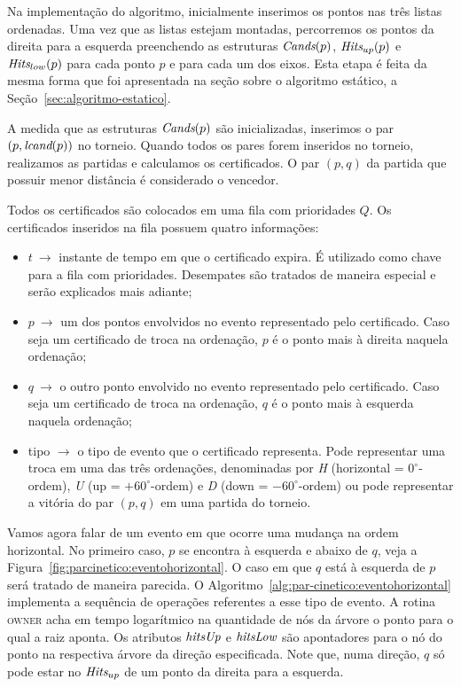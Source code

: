 Na implementação do algoritmo, inicialmente inserimos os pontos nas três listas ordenadas.
Uma vez que as listas estejam montadas, percorremos os pontos da direita para a esquerda
preenchendo as estruturas $\textit{Cands}(p)$, $\textit{Hits}_{up}(p)$ e $\textit{Hits}_{low}(p)$ para cada ponto $p$ e
para cada um dos eixos.
Esta etapa é feita da mesma forma que foi apresentada na seção sobre o algoritmo estático, a
Seção~\ref{sec:algoritmo-estatico}.

A medida que as estruturas $\textit{Cands}(p)$ são inicializadas, inserimos o par $(p, \textit{lcand}(p))$ no
torneio.
Quando todos os pares forem inseridos no torneio, realizamos as partidas e calculamos os
certificados.
O par $(p, q)$ da partida que possuir menor distância é considerado o vencedor.

Todos os certificados são colocados em uma fila com prioridades $Q$.
Os certificados inseridos na fila possuem quatro informações:
\begin{itemize}
    \item $t~\rightarrow$ instante de tempo em que o certificado
    expira.
    É utilizado como chave para a fila com prioridades.
    Desempates são tratados de maneira especial e serão explicados
    mais adiante;
    \item $p~\rightarrow$ um dos pontos envolvidos no evento
    representado pelo certificado.
    Caso seja um certificado de troca na ordenação, $p$ é o ponto mais à direita naquela ordenação;
    \item $q~\rightarrow$ o outro ponto envolvido no evento representado pelo certificado.
    Caso seja um certificado de troca na ordenação, $q$ é o ponto mais à esquerda naquela
    ordenação;
    \item tipo $ \rightarrow$ o tipo de evento que o certificado representa.
    Pode representar uma troca em uma das três ordenações, denominadas por \textit{H} (horizontal =
    $0^\circ$-ordem), \textit{U} (up = $+60^\circ$-ordem) e \textit{D} (down = $-60^\circ$-ordem) ou pode
    representar a vitória do par $(p, q)$ em uma partida do torneio.
\end{itemize}



Vamos agora falar de um evento em que ocorre uma mudança na ordem horizontal.
No primeiro caso, $p$ se encontra à esquerda e abaixo de $q$, veja a
Figura~\ref{fig:parcinetico:eventohorizontal}.
O caso em que $q$ está à esquerda de $p$ será tratado de maneira parecida.
O Algoritmo~\ref{alg:par-cinetico:eventohorizontal} implementa a sequência de operações referentes
a esse tipo de evento.
A rotina \textsc{owner} acha em tempo logarítmico na quantidade de nós da árvore o ponto para o
qual a raiz aponta.
Os atributos $\textit{hitsUp}$ e $\textit{hitsLow}$ são apontadores para o nó do ponto na respectiva árvore da
direção especificada.
Note que, numa direção, $q$ só pode estar no $\textit{Hits}_{up}$ de um ponto da direita para a esquerda.

